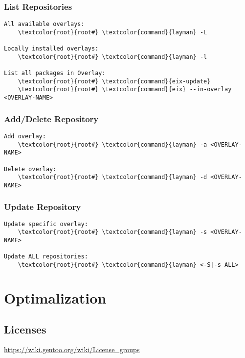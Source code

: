 \documentclass[10pt, a4paper, onecolumn, openany]{book}         %
\begin{document}
\subsection{List Repositories}
\begin{Verbatim}[commandchars=\\\{\}]
All available overlays:
    \textcolor{root}{root#} \textcolor{command}{layman} -L
    
Locally installed overlays:
    \textcolor{root}{root#} \textcolor{command}{layman} -l
    
List all packages in Overlay:
    \textcolor{root}{root#} \textcolor{command}{eix-update}
    \textcolor{root}{root#} \textcolor{command}{eix} --in-overlay <OVERLAY-NAME>
\end{Verbatim}

\subsection{Add/Delete Repository}
\begin{Verbatim}[commandchars=\\\{\}]
Add overlay:
    \textcolor{root}{root#} \textcolor{command}{layman} -a <OVERLAY-NAME>
    
Delete overlay:
    \textcolor{root}{root#} \textcolor{command}{layman} -d <OVERLAY-NAME>
\end{Verbatim}

\subsection{Update Repository}
\begin{Verbatim}[commandchars=\\\{\}]
Update specific overlay:
    \textcolor{root}{root#} \textcolor{command}{layman} -s <OVERLAY-NAME>
    
Update ALL repositories:
    \textcolor{root}{root#} \textcolor{command}{layman} <-S|-s ALL>
\end{Verbatim} 



\chapter{Optimalization}%
\section{Licenses}
\underline{\url{https://wiki.gentoo.org/wiki/License_groups}}
\end{document}
